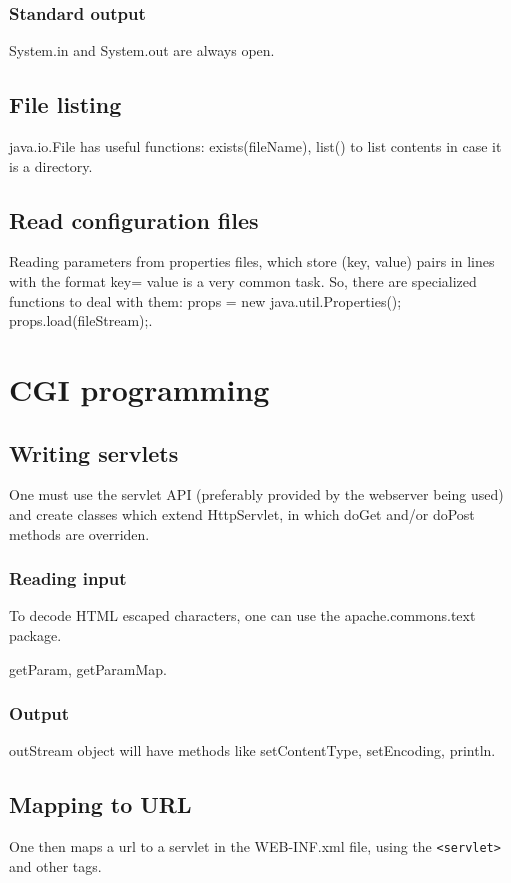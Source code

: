 \documentclass[oneside, article]{memoir}
\begin{document}
\subsubsection{Standard output}
System.in and System.out are always open.

\subsection{File listing}
java.io.File has useful functions: exists(fileName), list() to list contents in case it is a directory.

\subsection{Read configuration files}
Reading parameters from properties files, which store (key, value) pairs in lines with the format key= value is a very common task. So, there are specialized functions to deal with them: props = new java.util.Properties();  props.load(fileStream);.


\section{CGI programming}
\subsection{Writing servlets}
One must use the servlet API (preferably provided by the webserver being used) and create classes which extend HttpServlet, in which doGet and/or doPost methods are overriden.

\subsubsection{Reading input}
To decode HTML escaped characters, one can use the apache.commons.text package.

getParam, getParamMap.


\subsubsection{Output}
outStream object will have methods like setContentType, setEncoding, println.

\subsection{Mapping to URL}
One then maps a url to a servlet in the WEB-INF.xml file, using the \verb'<servlet>' and other tags.
\end{document}
